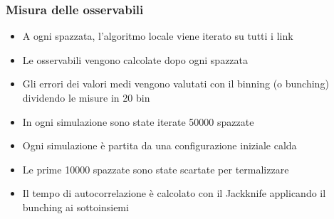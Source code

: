 \begin{frame}
    \frametitle{Misura delle osservabili}
    \begin{itemize}
        \item A ogni spazzata, l'algoritmo locale viene iterato su tutti i link
        \item Le osservabili vengono calcolate dopo ogni spazzata
        \item Gli errori dei valori medi vengono valutati con il binning (o bunching) %
            dividendo le misure in 20 bin
        \item In ogni simulazione sono state iterate 50000 spazzate
        \item Ogni simulazione è partita da una configurazione iniziale calda
        \item Le prime 10000 spazzate sono state scartate per termalizzare
        \item Il tempo di autocorrelazione è calcolato con il Jackknife %
            applicando il bunching ai sottoinsiemi
    \end{itemize}
\end{frame}

